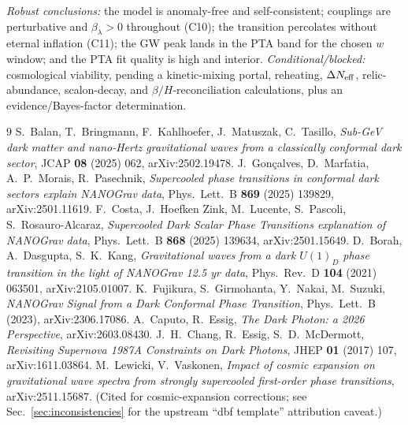 \documentclass[11pt]{article}
\newcommand{\betaH}{\beta/H}
\begin{document}
\emph{Robust conclusions:} the model is anomaly-free and self-consistent; couplings are perturbative
and $\beta_\lambda>0$ throughout (C10); the transition percolates without eternal inflation (C11);
the GW peak lands in the PTA band for the chosen $w$ window; and the PTA fit quality is high and
interior. \emph{Conditional/blocked:} cosmological viability, pending a kinetic-mixing portal,
reheating, $\Delta N_{\rm eff}$, relic-abundance, scalon-decay, and $\betaH$-reconciliation
calculations, plus an evidence/Bayes-factor determination.


\begin{thebibliography}{9}
 S.~Balan, T.~Bringmann, F.~Kahlhoefer, J.~Matuszak, C.~Tasillo,
\emph{Sub-GeV dark matter and nano-Hertz gravitational waves from a classically conformal dark sector},
JCAP \textbf{08} (2025) 062, arXiv:2502.19478.
 J.~Gon\c{c}alves, D.~Marfatia, A.~P.~Morais, R.~Pasechnik,
\emph{Supercooled phase transitions in conformal dark sectors explain NANOGrav data},
Phys.\ Lett.\ B \textbf{869} (2025) 139829, arXiv:2501.11619.
 F.~Costa, J.~Hoefken Zink, M.~Lucente, S.~Pascoli, S.~Rosauro-Alcaraz,
\emph{Supercooled Dark Scalar Phase Transitions explanation of NANOGrav data},
Phys.\ Lett.\ B \textbf{868} (2025) 139634, arXiv:2501.15649.
 D.~Borah, A.~Dasgupta, S.~K.~Kang,
\emph{Gravitational waves from a dark $U(1)_D$ phase transition in the light of NANOGrav 12.5 yr data},
Phys.\ Rev.\ D \textbf{104} (2021) 063501, arXiv:2105.01007.
 K.~Fujikura, S.~Girmohanta, Y.~Nakai, M.~Suzuki,
\emph{NANOGrav Signal from a Dark Conformal Phase Transition},
Phys.\ Lett.\ B (2023), arXiv:2306.17086.
 A.~Caputo, R.~Essig,
\emph{The Dark Photon: a 2026 Perspective}, arXiv:2603.08430.
 J.~H.~Chang, R.~Essig, S.~D.~McDermott,
\emph{Revisiting Supernova 1987A Constraints on Dark Photons},
JHEP \textbf{01} (2017) 107, arXiv:1611.03864.
 M.~Lewicki, V.~Vaskonen,
\emph{Impact of cosmic expansion on gravitational wave spectra from strongly supercooled
first-order phase transitions}, arXiv:2511.15687. (Cited for cosmic-expansion corrections;
see Sec.~\ref{sec:inconsistencies} for the upstream ``dbf template'' attribution caveat.)
\end{thebibliography}
\end{document}
